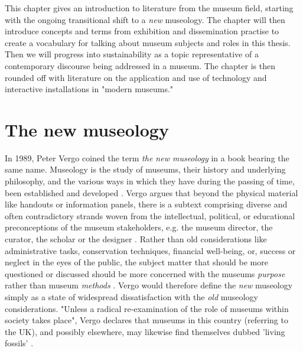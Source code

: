 This chapter gives an introduction to literature from the museum field, starting with the ongoing transitional shift to a \emph{new} museology. The chapter will then introduce concepts and terms from exhibition and dissemination practise to create a vocabulary for talking about museum subjects and roles in this thesis. Then we will progress into sustainability as a topic representative of a contemporary discourse being addressed in a museum. The chapter is then rounded off with literature on the application and use of technology and interactive installations in "modern museums."


\section{The new museology}
In 1989, Peter Vergo coined the term \emph{the new museology} in a book bearing the same name. Museology is the study of museums, their history and underlying philosophy, and the various ways in which they have during the passing of time, been established and developed \autocite[p.1]{vergo_museology_1989}. Vergo argues that beyond the physical material like handouts or information panels, there is a subtext comprising diverse and often contradictory strands woven from the intellectual, political, or educational preconceptions of the museum stakeholders, e.g. the museum director, the curator, the scholar or the designer \autocite[p.3]{vergo_museology_1989}. Rather than old considerations like administrative tasks, conservation techniques, financial well-being, or, success or neglect in the eyes of the public, the subject matter that should be more questioned or discussed should be more concerned with the museums \emph{purpose} rather than museum \emph{methods} \autocite[p.3]{vergo_museology_1989}. Vergo would therefore define the \emph{new} museology simply as a state of widespread dissatisfaction with the \emph{old} museology considerations. "Unless a radical re-examination of the role of museums within society takes place", Vergo declares that museums in this country (referring to the UK), and possibly elsewhere, may likewise find themselves dubbed 'living fossils' \autocite[p.4]{vergo_museology_1989}.

